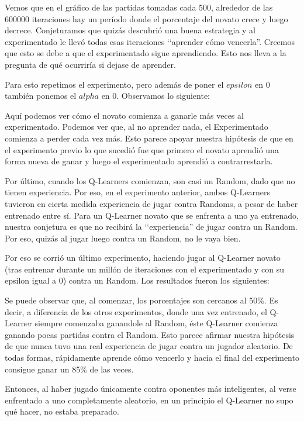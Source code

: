 Vemos que en el gráfico de las partidas tomadas cada 500, alrededor de las 600000 iteraciones hay un período donde el porcentaje del novato crece y luego decrece. Conjeturamos que quizás descubrió una buena estrategia y al experimentado le llevó todas esas iteraciones ‘‘aprender cómo vencerla''. Creemos que esto se debe a que el experimentado sigue aprendiendo. Esto nos lleva a la pregunta de qué ocurriría si dejase de aprender.

Para esto repetimos el experimento, pero además de poner el $epsilon$ en 0 también ponemos el $alpha$ en 0. Observamos lo siguiente:



Aquí podemos ver cómo el novato comienza a ganarle más veces al experimentado. Podemos ver que, al no aprender nada, el Experimentado comienza a perder cada vez más. Esto parece apoyar nuestra hipótesis de que en el experimento previo lo que sucedió fue que primero el novato aprendió una forma nueva de ganar y luego el experimentado aprendió a contrarrestarla.

Por último, cuando los Q-Learners comienzan, son casi un Random, dado que no tienen experiencia. Por eso, en el experimento anterior, ambos Q-Learners tuvieron en cierta medida experiencia de jugar contra Randoms, a pesar de haber entrenado entre sí. Para un Q-Learner novato que se enfrenta a uno ya entrenado, nuestra conjetura es que no recibirá la ‘‘experiencia'' de jugar contra un Random. Por eso, quizás al jugar luego contra un Random, no le vaya bien.

Por eso se corrió un último experimento, haciendo jugar al Q-Learner novato (tras entrenar durante un millón de iteraciones con el experimentado y con su epsilon igual a 0) contra un Random. Los resultados fueron los siguientes:



Se puede observar que, al comenzar, los porcentajes son cercanos al 50\%. Es decir, a diferencia de los otros experimentos, donde una vez entrenado, el Q-Learner siempre comenzaba ganandole al Random, éste Q-Learner comienza ganando pocas partidas contra el Random. Esto parece afirmar nuestra hipótesis de que nunca tuvo una real experiencia de jugar contra un jugador aleatorio. De todas formas, rápidamente aprende cómo vencerlo y hacia el final del experimento consigue ganar un 85\% de las veces.

Entonces, al haber jugado únicamente contra oponentes más inteligentes, al verse enfrentado a uno completamente aleatorio, en un principio el Q-Learner no supo qué hacer, no estaba preparado.
